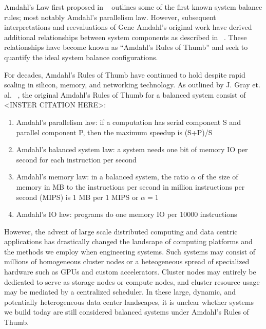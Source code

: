 \documentclass{sig-alternate}
\begin{document}

Amdahl's Law first proposed in ~\cite{Amdahl:1967:VSP:1465482.1465560} outlines some of the first known system balance rules; most notably Amdahl's parallelism law.
However, subsequent interpretations and reevaluations of Gene Amdahl's original work have derived additional relationships between system components as described in ~\cite{Gustafson:1988:RAL:42411.42415, Hill:2008:ALM:1449375.1449387, export:68636, Bell:2006:PCS:1110638.1110681}.
These relationships have become known as ``Amdahl's Rules of Thumb'' and seek to quantify the ideal system balance configurations.

For decades, Amdahl's Rules of Thumb have continued to hold despite rapid scaling in silicon, memory, and networking technology.
As outlined by J. Gray et. al. ~\cite{export:68636}, the original Amdahl's Rules of Thumb for a balanced system consist of <INSTER CITATION HERE>:
\begin{enumerate}
\item Amdahl's parallelism law: if a computation has serial component S and parallel component P, then the maximum speedup is (S+P)/S
\item Amdahl's balanced system law: a system needs one bit of memory IO per second for each instruction per second
\item Amdahl's memory law: in a balanced system, the ratio $\alpha$ of the size of memory in MB to the instructions per second in million instructions per second (MIPS) is 1 MB per 1 MIPS or $\alpha = 1$
\item Amdahl's IO law: programs do one memory IO per 10000 instructions
\end{enumerate}
However, the advent of large scale distributed computing and data centric applications has drastically changed the landscape of computing platforms and the methods we employ when engineering systems.
Such systems may consist of millions of homogeneous cluster nodes or a heteogeneous spread of specialized hardware such as GPUs and custom accelerators.
Cluster nodes may entirely be dedicated to serve as storage nodes or compute nodes, and cluster resource usage may be mediated by a centralized scheduler.
In these large, dynamic, and potentially heterogeneous data center landscapes, it is unclear whether systems we build today are still considered balanced systems under Amdahl's Rules of Thumb.
\end{document}
